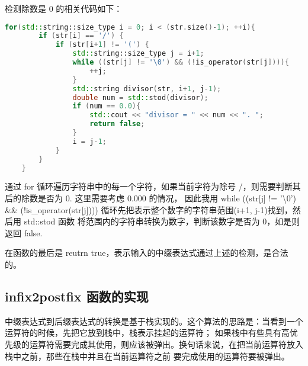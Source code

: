 \documentclass[UTF8]{ctexart}
\begin{document}
检测除数是 0 的相关代码如下：
\begin{lstlisting}[language=c++, breaklines=true, keywordstyle=\color{blue!70}, commentstyle=\color{red!50!green!50!blue!50}, frame=shadowbox, rulesepcolor=\color{red!20!green!20!blue!20}]
    for(std::string::size_type i = 0; i < (str.size()-1); ++i){
        if (str[i] == '/') {
            if (str[i+1] != '(') {
                std::string::size_type j = i+1;
                while ((str[j] != '\0') && (!is_operator(str[j]))){
                    ++j;  
                }
                std::string divisor(str, i+1, j-1);
                double num = std::stod(divisor);
                if (num == 0.0){
                    std::cout << "divisor = " << num << ". ";
                    return false;
                }
                i = j-1; 
            }
        }
    }
\end{lstlisting}
通过 for 循环遍历字符串中的每一个字符，如果当前字符为除号 /，则需要判断其后的除数是否为 0. 这里需要考虑 0.000 的情况，
因此我用 while ((str[j] != '\textbackslash0') \&\& (!is\_operator(str[j]))) 循环先把表示整个数字的字符串范围(i+1, j-1)找到，然后用 std::stod 函数
将范围内的字符串转换为数字，判断该数字是否为 0，如是则返回 false. 

在函数的最后是 reutrn true，表示输入的中缀表达式通过上述的检测，是合法的。

\subsection{infix2postfix 函数的实现}
中缀表达式到后缀表达式的转换是基于栈实现的。这个算法的思路是：当看到一个运算符的时候，先把它放到栈中，栈表示挂起的运算符；
如果栈中有些具有高优先级的运算符需要完成其使用，则应该被弹出。换句话来说，在把当前运算符放入栈中之前，那些在栈中并且在当前运算符之前
要完成使用的运算符要被弹出。
\end{document}

